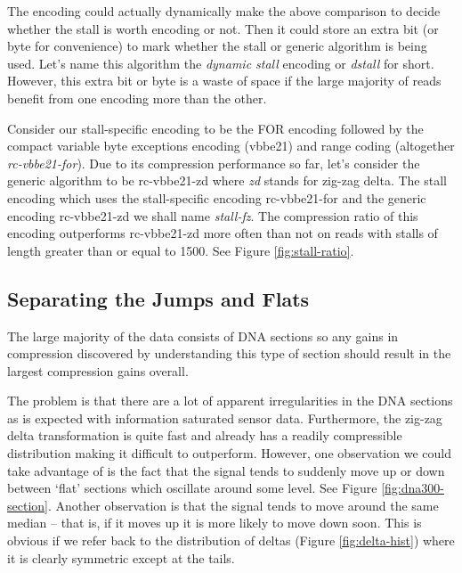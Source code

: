 
The encoding could actually dynamically make the above comparison to decide
whether the stall is worth encoding or not. Then it could store an extra bit (or
byte for convenience) to mark whether the stall or generic algorithm is being
used. Let's name this algorithm the \textit{dynamic stall} encoding or
\textit{dstall} for short. However, this extra bit or byte is a waste of space
if the large majority of reads benefit from one encoding more than the other.

Consider our stall-specific encoding to be the FOR encoding followed by the
compact variable byte exceptions encoding (vbbe21) and range coding (altogether
\textit{rc-vbbe21-for}). Due to its compression performance so far, let's
consider the generic algorithm to be rc-vbbe21-zd where \textit{zd} stands for
zig-zag delta. The stall encoding which uses the stall-specific encoding
rc-vbbe21-for and the generic encoding rc-vbbe21-zd we shall name
\textit{stall-fz}. The compression ratio of this encoding outperforms
rc-vbbe21-zd more often than not on reads with stalls of length greater than or
equal to 1500. See Figure \ref{fig:stall-ratio}.




\subsection{Separating the Jumps and Flats}

The large majority of the data consists of DNA sections so any gains in
compression discovered by understanding this type of section should
result in the largest compression gains overall.

The problem is that there are a lot of apparent irregularities in the DNA
sections as is expected with information saturated sensor data. Furthermore, the
zig-zag delta transformation is quite fast and already has a readily
compressible distribution making it difficult to outperform. However, one
observation we could take advantage of is the fact that the signal tends to
suddenly move up or down between `flat' sections which oscillate around some
level. See Figure \ref{fig:dna300-section}. Another observation is that the
signal tends to move around the same median -- that is, if it moves up it is
more likely to move down soon. This is obvious if we refer back to the
distribution of deltas (Figure \ref{fig:delta-hist}) where it is clearly
symmetric except at the tails.


